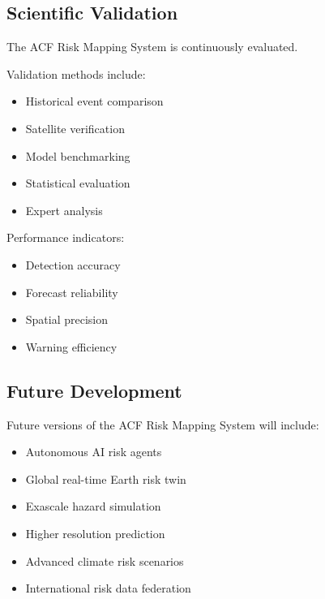 
\subsection{Scientific Validation}

The ACF Risk Mapping System is continuously evaluated.

Validation methods include:

\begin{itemize}

\item Historical event comparison

\item Satellite verification

\item Model benchmarking

\item Statistical evaluation

\item Expert analysis

\end{itemize}


Performance indicators:

\begin{itemize}

\item Detection accuracy

\item Forecast reliability

\item Spatial precision

\item Warning efficiency

\end{itemize}



\subsection{Future Development}

Future versions of the ACF Risk Mapping System will include:

\begin{itemize}

\item Autonomous AI risk agents

\item Global real-time Earth risk twin

\item Exascale hazard simulation

\item Higher resolution prediction

\item Advanced climate risk scenarios

\item International risk data federation

\end{itemize}


